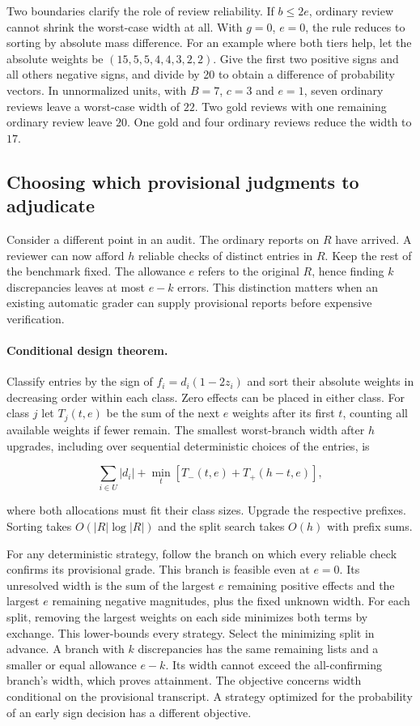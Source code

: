 \documentclass[10pt,letterpaper]{article}
\begin{document}
Two boundaries clarify the role of review reliability. If $b\leq2e$, ordinary review cannot shrink the worst-case width at all. With $g=0$, $e=0$, the rule reduces to sorting by absolute mass difference. For an example where both tiers help, let the absolute weights be $(15,5,5,4,4,3,2,2)$. Give the first two positive signs and all others negative signs, and divide by 20 to obtain a difference of probability vectors. In unnormalized units, with $B=7$, $c=3$ and $e=1$, seven ordinary reviews leave a worst-case width of $22$. Two gold reviews with one remaining ordinary review leave $20$. One gold and four ordinary reviews reduce the width to $17$.

\subsection*{Choosing which provisional judgments to adjudicate}
Consider a different point in an audit. The ordinary reports on $R$ have arrived. A reviewer can now afford $h$ reliable checks of distinct entries in $R$. Keep the rest of the benchmark fixed. The allowance $e$ refers to the original $R$, hence finding $k$ discrepancies leaves at most $e-k$ errors. This distinction matters when an existing automatic grader can supply provisional reports before expensive verification.

\paragraph{Conditional design theorem.}
Classify entries by the sign of $f_i=d_i(1-2z_i)$ and sort their absolute weights in decreasing order within each class. Zero effects can be placed in either class. For class $j$ let $T_j(t,e)$ be the sum of the next $e$ weights after its first $t$, counting all available weights if fewer remain. The smallest worst-branch width after $h$ upgrades, including over sequential deterministic choices of the entries, is
\begin{linenomath}
\[
 \sum_{i\in U}|d_i|+\min_{t}\left[T_-(t,e)+T_+(h-t,e)\right],
\]
\end{linenomath}
where both allocations must fit their class sizes. Upgrade the respective prefixes. Sorting takes $O(|R|\log |R|)$ and the split search takes $O(h)$ with prefix sums.

For any deterministic strategy, follow the branch on which every reliable check confirms its provisional grade. This branch is feasible even at $e=0$. Its unresolved width is the sum of the largest $e$ remaining positive effects and the largest $e$ remaining negative magnitudes, plus the fixed unknown width. For each split, removing the largest weights on each side minimizes both terms by exchange. This lower-bounds every strategy. Select the minimizing split in advance. A branch with $k$ discrepancies has the same remaining lists and a smaller or equal allowance $e-k$. Its width cannot exceed the all-confirming branch's width, which proves attainment. The objective concerns width conditional on the provisional transcript. A strategy optimized for the probability of an early sign decision has a different objective.
\end{document}
